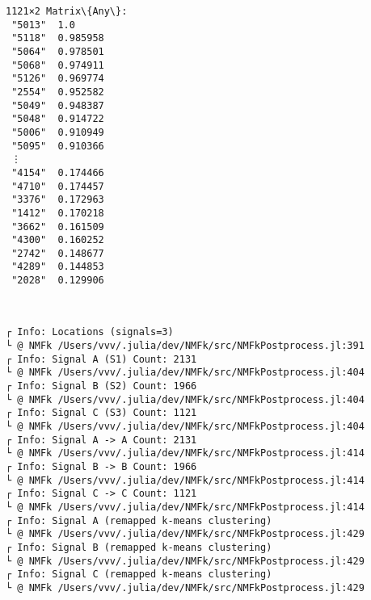 \documentclass[11pt]{article}
\begin{document}
    
    
    \begin{Verbatim}[commandchars=\\\{\}]
1121×2 Matrix\{Any\}:
 "5013"  1.0
 "5118"  0.985958
 "5064"  0.978501
 "5068"  0.974911
 "5126"  0.969774
 "2554"  0.952582
 "5049"  0.948387
 "5048"  0.914722
 "5006"  0.910949
 "5095"  0.910366
 ⋮       
 "4154"  0.174466
 "4710"  0.174457
 "3376"  0.172963
 "1412"  0.170218
 "3662"  0.161509
 "4300"  0.160252
 "2742"  0.148677
 "4289"  0.144853
 "2028"  0.129906
    \end{Verbatim}

    
    \begin{center}
    \end{center}
    { \hspace*{\fill} \\}
    
    \begin{Verbatim}[commandchars=\\\{\}]
┌ Info: Locations (signals=3)
└ @ NMFk /Users/vvv/.julia/dev/NMFk/src/NMFkPostprocess.jl:391
┌ Info: Signal A (S1) Count: 2131
└ @ NMFk /Users/vvv/.julia/dev/NMFk/src/NMFkPostprocess.jl:404
┌ Info: Signal B (S2) Count: 1966
└ @ NMFk /Users/vvv/.julia/dev/NMFk/src/NMFkPostprocess.jl:404
┌ Info: Signal C (S3) Count: 1121
└ @ NMFk /Users/vvv/.julia/dev/NMFk/src/NMFkPostprocess.jl:404
┌ Info: Signal A -> A Count: 2131
└ @ NMFk /Users/vvv/.julia/dev/NMFk/src/NMFkPostprocess.jl:414
┌ Info: Signal B -> B Count: 1966
└ @ NMFk /Users/vvv/.julia/dev/NMFk/src/NMFkPostprocess.jl:414
┌ Info: Signal C -> C Count: 1121
└ @ NMFk /Users/vvv/.julia/dev/NMFk/src/NMFkPostprocess.jl:414
┌ Info: Signal A (remapped k-means clustering)
└ @ NMFk /Users/vvv/.julia/dev/NMFk/src/NMFkPostprocess.jl:429
┌ Info: Signal B (remapped k-means clustering)
└ @ NMFk /Users/vvv/.julia/dev/NMFk/src/NMFkPostprocess.jl:429
┌ Info: Signal C (remapped k-means clustering)
└ @ NMFk /Users/vvv/.julia/dev/NMFk/src/NMFkPostprocess.jl:429
    \end{Verbatim}

    \begin{center}
    \end{center}
    { \hspace*{\fill} \\}
    
\end{document}
